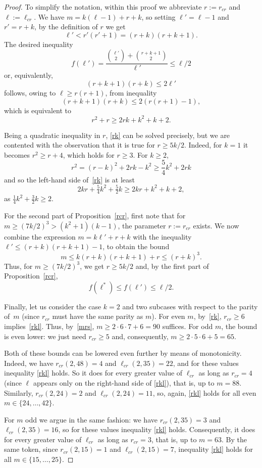 \documentclass[reqno, 12pt]{amsart}
\numberwithin{equation}{section}
\numberwithin{figure}{section}
\theoremstyle{plain}
\theoremstyle{definition}
\begin{document}
\rcrr*
\begin{proof} To simplify the notation, within this proof we abbreviate $r:=r_{cr}$ and $\ell:=\ell_{cr}.$ We have $m=k(\ell-1)+r+k$, so setting $\ell'=\ell-1$ and $r'=r+k$, by the definition of $r$ we get
$$\ell'<r'(r'+1)=(r+k)(r+k+1).$$
The desired inequality
$$f(\ell')=\frac{\binom{\ell'}2+\binom{r+k+1}2}{\ell'}\le \ell/2$$
or, equivalently,
\begin{equation}\label{rkl}
    (r+k+1)(r+k)\le 2\ell'
\end{equation}
follows, owing to $\ell\ge r(r+1)$, from inequality
$$(r+k+1)(r+k)\le 2\left(r(r+1)-1\right),$$
which is equivalent to
\begin{equation}\label{rk}
r^2+r\ge 2rk+k^2+k+2.
\end{equation}

Being a quadratic inequality in $r$, \eqref{rk} can be solved precisely, but we are contented with the observation that it is true for $r\ge 5k/2$. Indeed, for $k=1$ it becomes $r^2\ge r+4$, which holds for $r\ge3$. For $k\ge2$,
$$r^2=(r-k)^2+2rk-k^2\ge\frac54k^2+2rk$$
and so the left-hand side of~\eqref{rk} is at least
$$2kr+\tfrac54k^2+\tfrac52k\ge2kr+k^2+k+2,$$
as $\tfrac14k^2+\tfrac32k\ge 2$.
	
For the second part of Proposition~\ref{rcr}, first note that for $m\ge(7k/2)^3>(k^2+1)(k-1)$, the parameter $r:=r_{cr}$ exists. We now combine the expression $m=k\ell'+r+k$ with the inequality $\ell'\le(r+k)(r+k+1)-1$, to obtain the bound
$$m\le k(r+k)(r+k+1)+r\le (r+k)^3.$$
Thus, for $m\ge(7k/2)^3$, we get $r\ge5k/2$ and, by the first part of Proposition~\ref{rcr},
$$f(\ell^*)\le f(\ell')\le \ell/2.$$

Finally, let us consider the case $k=2$ and two subcases with respect to the parity of~$m$ (since $r_{cr}$ must have the same parity as $m$). For even $m$, by~\eqref{rk}, $r_{cr}\ge6$ implies~\eqref{rkl}. Thus,  by~\eqref{mrs},  $m\ge 2\cdot 6\cdot 7+6=90$ suffices. For odd $m$, the bound is even lower: we just need $r_{cr}\ge5$ and, consequently, $m\ge 2\cdot5\cdot6+5=65$.

Both of these bounds can be lowered even further by means of monotonicity.
Indeed, we have $r_{cr}(2,48)=4$ and $\ell_{cr}(2,35)=22$, and for these values inequality \eqref{rkl} holds. So it does for every greater value of $\ell_{cr}$ as long as $r_{cr}=4$ (since $\ell$ appears only on the right-hand side of \eqref{rkl}), that is, up to $m=88$. Similarly, $r_{cr}(2,24)=2$  and $\ell_{cr}(2,24)=11$, so, again, \eqref{rkl} holds for all even $m\in\{24,\dots,42\}$.


For $m$ odd we argue in the same fashion: we have $r_{cr}(2,35)=3$ and $\ell_{cr}(2,35)=16$, so for these values inequality \eqref{rkl} holds. Consequently, it does for every greater value of $\ell_{cr}$ as long as $r_{cr}=3$, that is, up to $m=63$. By the same token, since $r_{cr}(2,15)=1$  and $\ell_{cr}(2,15)=7$, inequality \eqref{rkl} holds for all $m\in\{15,\dots,25\}$.

\end{proof}
\end{document}
